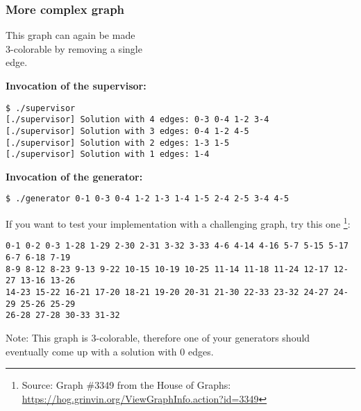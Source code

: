 \vspace{7mm}
\begin{multicols}{2}
\subsubsection*{More complex graph}


\vfill

This graph can again be made\\
3-colorable by removing a single\\
edge.

\columnbreak

\textbf{Invocation of the supervisor:}
\vspace{-5mm}
\begin{verbatim}
$ ./supervisor
[./supervisor] Solution with 4 edges: 0-3 0-4 1-2 3-4
[./supervisor] Solution with 3 edges: 0-4 1-2 4-5
[./supervisor] Solution with 2 edges: 1-3 1-5
[./supervisor] Solution with 1 edges: 1-4
\end{verbatim}

\textbf{Invocation of the generator:}
\vspace{-5mm}
\begin{verbatim}
$ ./generator 0-1 0-3 0-4 1-2 1-3 1-4 1-5 2-4 2-5 3-4 4-5
\end{verbatim}
\end{multicols}

\vspace{5mm}
If you want to test your implementation with a challenging graph, try this one
\footnote{
Source: Graph \#3349 from the House of Graphs:
\url{https://hog.grinvin.org/ViewGraphInfo.action?id=3349}
}:

\texttt{0-1 0-2 0-3 1-28 1-29 2-30 2-31 3-32 3-33 4-6 4-14 4-16 5-7 5-15 5-17 6-7 6-18 7-19\\
8-9 8-12 8-23 9-13 9-22 10-15 10-19 10-25 11-14 11-18 11-24 12-17 12-27 13-16 13-26\\
14-23 15-22 16-21 17-20 18-21 19-20 20-31 21-30 22-33 23-32 24-27 24-29 25-26 25-29\\
26-28 27-28 30-33 31-32}

Note: This graph is 3-colorable,
therefore one of your generators should eventually come up with a solution with 0 edges.

\osueguidelinesthree


